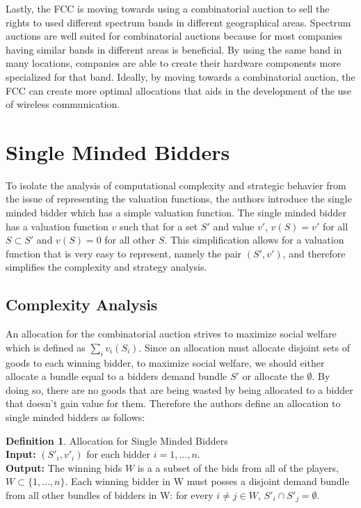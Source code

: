 \documentclass[10pt,onecolumn,letterpaper]{article}
\theoremstyle{definition}
\newtheorem{definition}{Definition}[section]
\begin{document}
Lastly, the FCC is moving towards using a combinatorial auction to sell the rights to used different spectrum bands in different geographical areas. Spectrum auctions are well suited for combinatorial auctions because for most companies having similar bands in different areas is beneficial. By using the same band in many locations, companies are able to create their hardware components more specialized for that band. Ideally, by moving towards a combinatorial auction, the FCC can create more optimal allocations that aids in the development of the use of wireless communication.

\section{Single Minded Bidders} %

To isolate the analysis of computational complexity and strategic behavier from the issue of representing the valuation functions, the authors introduce the single minded bidder which has a simple valuation function. The single minded bidder has a valuation function $v$ such that for a set $S'$ and value $v'$, $v(S) = v'$ for all $S \subset S'$ and $v(S) = 0$ for all other $S$. This simplification allows for a valuation function that is very easy to represent, namely the pair $(S', v')$, and therefore simplifies the complexity and strategy analysis.

\subsection{Complexity Analysis}
An allocation for the combinatorial auction strives to maximize social welfare which is defined as $\sum_i v_i(S_i)$. Since an allocation must allocate disjoint sets of goods to each winning bidder, to maximize social welfare, we should either allocate a bundle equal to a bidders demand bundle $S'$ or allocate the $\emptyset$. By doing so, there are no goods that are being wasted by being allocated to a bidder that doesn't gain value for them. Therefore the authors define an allocation to single minded bidders as follows:

\theoremstyle{definition}
\begin{definition}{Allocation for Single Minded Bidders}
\\
\textbf{Input:} $(S'_i,v'_i)$ for each bidder $i = 1,...,n$.
\\
\textbf{Output:} The winning bids $W$ is a a subset of the bids from all of the players, $W \subset \{1,...,n\}$. Each winning bidder in W must posses a disjoint demand bundle from all other bundles of bidders in W: for every $i \neq j \in W$, $S'_i \cap S'_j = \emptyset$.
\end{definition}
\end{document}
